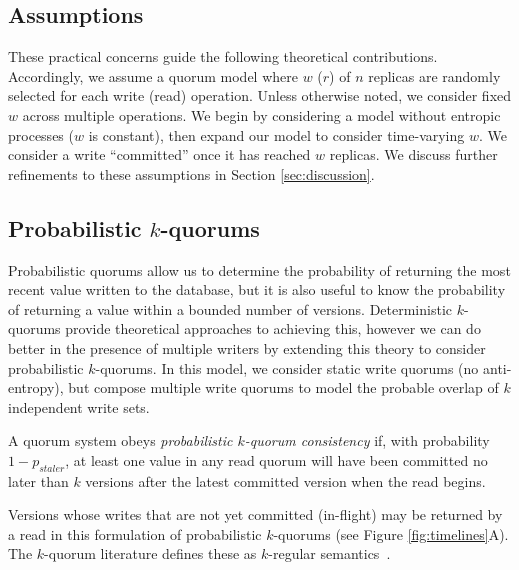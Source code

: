 \documentclass{vldb}
\begin{document}
\subsection{Assumptions}

These practical concerns guide the following theoretical
contributions.  Accordingly, we assume a quorum model where $w$ ($r$)
of $n$ replicas are randomly selected for each write (read) operation.
Unless otherwise noted, we consider fixed $w$ across multiple
operations.  We begin by considering a model without entropic
processes ($w$ is constant), then expand our model to consider
time-varying $w$. We consider a write ``committed'' once it has
reached $w$ replicas. We discuss further refinements to these
assumptions in Section \ref{sec:discussion}.

\subsection{Probabilistic $k$-quorums}

Probabilistic quorums allow us to determine the probability of
returning the most recent value written to the database, but it is
also useful to know the probability of returning a value within a
bounded number of versions.  Deterministic $k$-quorums provide
theoretical approaches to achieving this, however we can do better in
the presence of multiple writers by extending this theory to consider
probabilistic $k$-quorums.  In this model, we consider static write
quorums (no anti-entropy), but compose multiple write quorums to model the probable overlap of $k$ independent write sets.

\begin{definition}
A quorum system obeys \textit{probabilistic $k$-quorum consistency} if, with
probability $1-p_{staler}$, at least one value in any read quorum will
have been committed no later than $k$ versions after the latest committed
version when the read begins.
\end{definition}

Versions whose writes that are not yet committed (in-flight) may be
returned by a read in this formulation of probabilistic $k$-quorums
(see Figure \ref{fig:timelines}A).  The $k$-quorum literature defines these as $k$-regular semantics~\cite{nonstrict-availability}.
\end{document}
